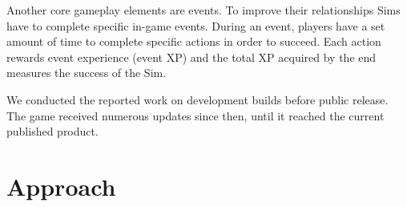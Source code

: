 \documentclass[letterpaper]{article} %
\begin{document}

Another core gameplay elements are events. To improve their relationships Sims have to complete specific in-game events. During an event, players have a set amount of time to complete specific actions in order to succeed. Each action rewards event experience (event XP) and the total XP acquired by the end measures the success of the Sim.


We conducted the reported work on development builds before public release.  The game received numerous updates since then, until it reached the current published product.

\section{Approach}
\end{document}
